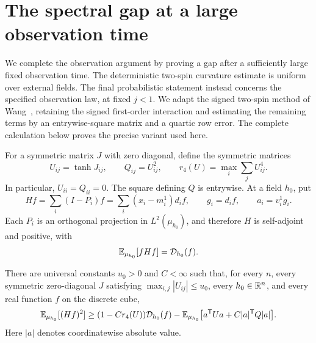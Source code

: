 \section{The spectral gap at a large observation time}
\label{sec:terminal}

We complete the observation argument by proving a gap after a sufficiently
large fixed observation time. The deterministic two-spin curvature estimate
is uniform over external fields. The final probabilistic statement instead
concerns the specified observation law, at fixed $j<1$.
We adapt the signed two-spin method of Wang~\cite[Lemma~3.4]{Wang2026},
retaining the signed first-order interaction and estimating the remaining
terms by an entrywise-square matrix and a quartic row error. The complete
calculation below proves the precise variant used here.

For a symmetric matrix $J$ with zero diagonal, define the symmetric matrices
\[
 U_{ij}=\tanh J_{ij},\qquad Q_{ij}=U_{ij}^2,\qquad
 r_4(U)=\max_i\sum_j U_{ij}^4.
\]
In particular, $U_{ii}=Q_{ii}=0$.  The square defining $Q$ is entrywise.
At a field $h_0$, put
\[
 Hf=\sum_i(I-P_i)f
    =\sum_i(x_i-m_i^1)d_i f,\qquad
 g_i=d_i f,\qquad a_i=v_i^1g_i.
\]
Each $P_i$ is an orthogonal projection in $L^2(\mu_{h_0})$, and therefore
$H$ is self-adjoint and positive, with
\begin{equation}
 \mathbb E_{\mu_{h_0}}[fHf]=\mathcal D_{h_0}(f).
 \label{eq:terminal-generator-form}
\end{equation}

\begin{lemma}
\label{lem:curvature}
There are universal constants $u_0>0$ and $C<\infty$ such that, for every
$n$, every symmetric zero-diagonal $J$ satisfying
$\max_{i,j}|U_{ij}|\le u_0$, every $h_0\in\mathbb R^n$, and every real function $f$
on the discrete cube,
\begin{equation}
 \mathbb E_{\mu_{h_0}}[(Hf)^2]
 \ge (1-Cr_4(U))\mathcal D_{h_0}(f)
       -\mathbb E_{\mu_{h_0}}\bigl[a^{\mathsf T}Ua
                         +C|a|^{\mathsf T}Q|a|\bigr].
 \label{eq:terminal-curvature}
\end{equation}
Here $|a|$ denotes coordinatewise absolute value.
\end{lemma}

